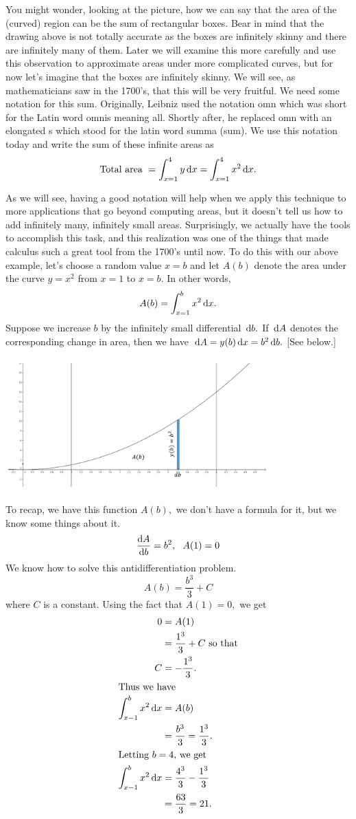   You might wonder, looking at the picture, how we can say that the
  area of the (curved) region can be the sum of rectangular boxes.
  Bear in mind that the drawing above is not totally accurate as the
  boxes are infinitely skinny and there are infinitely many of them.
  Later we will examine this more carefully and use this observation
  to approximate areas under more complicated curves, but for now
  let's imagine that the boxes are infinitely skinny.  We will see, as
  mathematicians saw in the 1700's, that this will be very fruitful.
  We need some notation for this sum.  Originally, Leibniz used the
  notation omn which was short for the Latin word omnis meaning all.
  Shortly after, he replaced omn with an elongated s which stood for
  the latin word summa (sum).  We use this notation today and write
  the sum of these infinite areas as 
$$
\text{Total area } =\int_{x=1}^4 y \thinspace{\rm d}x =\int_{x=1}^4x^2 \thinspace{\rm d}x.
$$

As we will see, having a good notation will help when we apply this
technique to more applications that go beyond computing areas, but it
doesn't tell us how to add infinitely many, infinitely small areas.
Surprisingly, we actually have the tools to accomplish this task, and
this realization was one of the things that made calculus such a great
tool from the 1700's until now.  To do this with our above example,
let's choose a random value $x=b$ and let $A(b)$ denote the area under the
curve $y=x^2$ from $x=1$ to $x=b.$  In other words,  
$$
A(b)=\int_{x=1}^bx^2 \thinspace{\rm d}x.
$$
Suppose we increase $b$ by the infinitely small differential $\thinspace{\rm d}b.$
If $\thinspace{\rm d}A$
denotes the corresponding change in area, then we have $\thinspace{\rm d}A=y(b)\thinspace{\rm d}x=b^2
\thinspace{\rm d}b.$ [See below.] \\
\centerline{\includegraphics*[height=2in,width=4in]{Figures/FTC-4}}
To recap, we have this function $A(b),$ we don't have a formula for it,
but we know some things about it. 
$$
\frac{\text{d}{A}}{\text{d}{b}}=b^2,\ \      A(1)=0
$$
We know how to solve this antidifferentiation problem.
$$
A(b)=\frac{b^3}{3}+C
$$
where $C$ is a constant. Using the fact that $A(1)=0,$ we get
\begin{align*}
  0&=A(1)\\
   &=\frac{1^3}{3}+C \text{ so that}\\
  C&=-\frac{1^3}{3}.\\
\intertext{Thus we have}
\int_{x-1}^bx^2\thinspace{\rm d}x &= A(b)\\
&= \frac{b^3}{3}=\frac{1^3}{3}.\\
\intertext{Letting $b=4,$ we get} 
\int_{x-1}^bx^2\thinspace{\rm d}x &= \frac{4^3}{3}-\frac{1^3}{3}\\
&= \frac{63}{3}= 21.
\end{align*}

